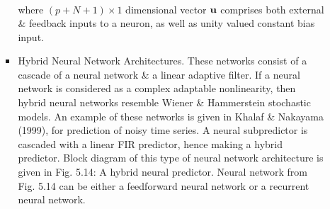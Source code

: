 \documentclass{article}
\begin{document}
\begin{enumerate}
\begin{itemize}
\begin{itemize}
\begin{align}
			\end{align}
			where $(p + N + 1)\times1$ dimensional vector ${\bf u}$ comprises both external \& feedback inputs to a neuron, as well as unity valued constant bias input.
			\item {\sf Hybrid Neural Network Architectures.} These networks consist of a cascade of a neural network \& a linear adaptive filter. If a neural network is considered as a complex adaptable nonlinearity, then hybrid neural networks resemble Wiener \& Hammerstein stochastic models. An example of these networks is given in Khalaf \& Nakayama (1999), for prediction of noisy time series. A neural subpredictor is cascaded with a linear FIR predictor, hence making a hybrid predictor. Block diagram of this type of neural network architecture is given in {\sf Fig. 5.14: A hybrid neural predictor}. Neural network from Fig. 5.14 can be either a feedforward neural network or a recurrent neural network.
			

\end{itemize}
\end{itemize}
\end{enumerate}
\end{document}
